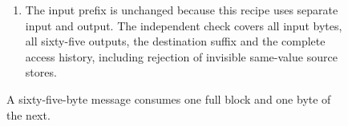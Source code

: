 \begin{figure}[htbp]
\begin{minipage}{\linewidth}
\begin{enumerate}
      \item The input prefix is unchanged because this recipe uses separate input and output. The independent check covers all input bytes, all sixty-five outputs, the destination suffix and the complete access history, including rejection of invisible same-value source stores.
    \end{enumerate}
  \end{minipage}
  \caption{A sixty-five-byte message consumes one full block and one byte of the next.}
  \label{capture:026-chacha20-f04}
  \label{chacha-f04}
\end{figure}
\par
